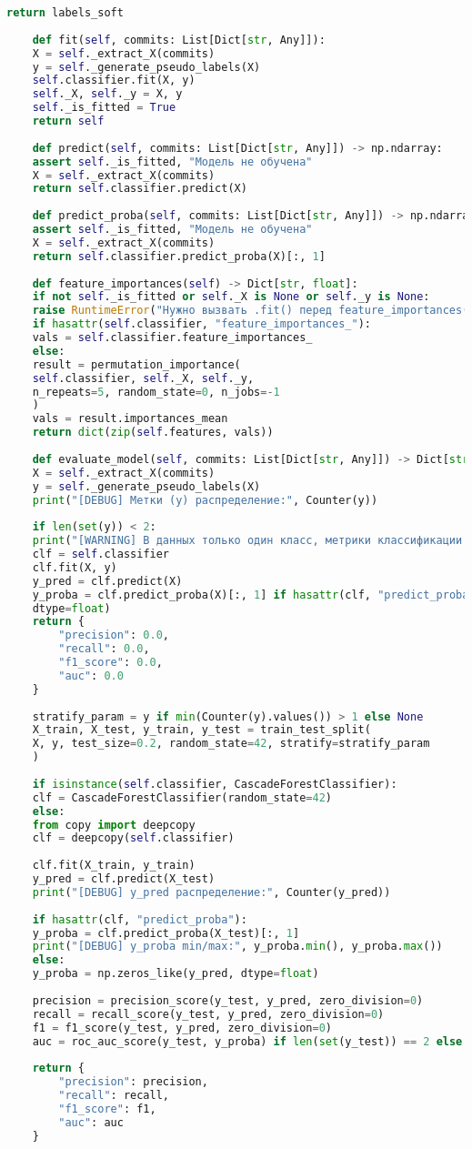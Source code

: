 \begin{lstlisting}[language=Python, caption={{ \texttt{ml\_model.py}}}]
	return labels_soft
	
	def fit(self, commits: List[Dict[str, Any]]):
	X = self._extract_X(commits)
	y = self._generate_pseudo_labels(X)
	self.classifier.fit(X, y)
	self._X, self._y = X, y
	self._is_fitted = True
	return self
	
	def predict(self, commits: List[Dict[str, Any]]) -> np.ndarray:
	assert self._is_fitted, "Модель не обучена"
	X = self._extract_X(commits)
	return self.classifier.predict(X)
	
	def predict_proba(self, commits: List[Dict[str, Any]]) -> np.ndarray:
	assert self._is_fitted, "Модель не обучена"
	X = self._extract_X(commits)
	return self.classifier.predict_proba(X)[:, 1]
	
	def feature_importances(self) -> Dict[str, float]:
	if not self._is_fitted or self._X is None or self._y is None:
	raise RuntimeError("Нужно вызвать .fit() перед feature_importances()")
	if hasattr(self.classifier, "feature_importances_"):
	vals = self.classifier.feature_importances_
	else:
	result = permutation_importance(
	self.classifier, self._X, self._y,
	n_repeats=5, random_state=0, n_jobs=-1
	)
	vals = result.importances_mean
	return dict(zip(self.features, vals))
	
	def evaluate_model(self, commits: List[Dict[str, Any]]) -> Dict[str, float]:
	X = self._extract_X(commits)
	y = self._generate_pseudo_labels(X)
	print("[DEBUG] Метки (y) распределение:", Counter(y))
	
	if len(set(y)) < 2:
	print("[WARNING] В данных только один класс, метрики классификации не применимы.")
	clf = self.classifier
	clf.fit(X, y)
	y_pred = clf.predict(X)
	y_proba = clf.predict_proba(X)[:, 1] if hasattr(clf, "predict_proba") else np.zeros_like(y_pred,
	dtype=float)
	return {
		"precision": 0.0,
		"recall": 0.0,
		"f1_score": 0.0,
		"auc": 0.0
	}
	
	stratify_param = y if min(Counter(y).values()) > 1 else None
	X_train, X_test, y_train, y_test = train_test_split(
	X, y, test_size=0.2, random_state=42, stratify=stratify_param
	)
	
	if isinstance(self.classifier, CascadeForestClassifier):
	clf = CascadeForestClassifier(random_state=42)
	else:
	from copy import deepcopy
	clf = deepcopy(self.classifier)
	
	clf.fit(X_train, y_train)
	y_pred = clf.predict(X_test)
	print("[DEBUG] y_pred распределение:", Counter(y_pred))
	
	if hasattr(clf, "predict_proba"):
	y_proba = clf.predict_proba(X_test)[:, 1]
	print("[DEBUG] y_proba min/max:", y_proba.min(), y_proba.max())
	else:
	y_proba = np.zeros_like(y_pred, dtype=float)
	
	precision = precision_score(y_test, y_pred, zero_division=0)
	recall = recall_score(y_test, y_pred, zero_division=0)
	f1 = f1_score(y_test, y_pred, zero_division=0)
	auc = roc_auc_score(y_test, y_proba) if len(set(y_test)) == 2 else 0.0
	
	return {
		"precision": precision,
		"recall": recall,
		"f1_score": f1,
		"auc": auc
	}
\end{lstlisting}

